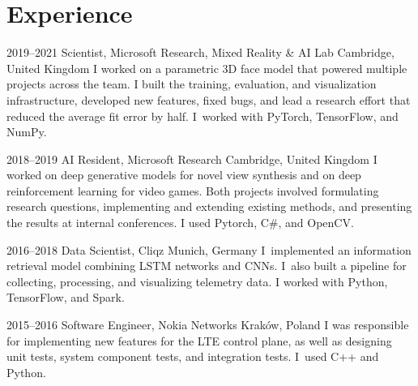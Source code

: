 \documentclass[]{friggeri-cv_osx}
\begin{document}
\vspace{5mm}
\begin{center}
\href{https://sebastiandziadzio.com}{\color{gray} \Large \faHome} \hspace{0.05cm}
\href{https://github.com/sebastiandziadzio}{\color{gray} \Large \faGithub} \hspace{0.05cm}
\href{https://twitter.com/sbdzdz}{\color{gray} \Large\faTwitter} \hspace{0.05cm}
\href{https://pl.linkedin.com/in/sebastiandziadzio}{\color{gray} \Large\faLinkedin} \hspace{0.05cm}
\href{https://scholar.google.com/citations?user=8vAIQXoAAAAJ&hl=en}{\color{gray} \Large\faGraduationCap} \hspace{0.05cm}
\end{center}
\vspace{2mm}

\section{Experience}
\begin{entrylist}
\entry
{2019–2021}
{Scientist, Microsoft Research, Mixed Reality \& AI Lab}
{Cambridge, United Kingdom}
{I worked on a parametric 3D face model that powered multiple projects across the team. I built the training, evaluation, and visualization infrastructure, developed new features, fixed bugs,
and lead a research effort that reduced the average fit error by half. I~worked with PyTorch, TensorFlow, and NumPy.\\}

\entry
{2018–2019}
{AI Resident, Microsoft Research}
{Cambridge, United Kingdom}
{I worked on deep generative models for novel view synthesis and on deep reinforcement learning for video games. Both projects involved
formulating research questions, implementing and extending existing methods, and presenting the results at internal conferences. I used Pytorch, C\#, and OpenCV.\\}

\entry
{2016–2018}
{Data Scientist, Cliqz}
{Munich, Germany}
{I~implemented an information retrieval model combining LSTM networks and CNNs. I~also built a pipeline for
collecting, processing, and visualizing telemetry data. I worked with Python, TensorFlow, and Spark.\\}

\entry
{2015–2016}
{Software Engineer, Nokia Networks}
{Kraków, Poland}
{I was responsible for implementing new features for the LTE control plane, as well as designing unit tests, system component tests,
and integration tests. I~used C++ and Python.\\}

\end{entrylist}
\end{document}

